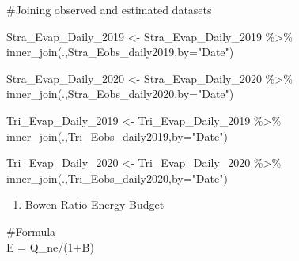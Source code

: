 \documentclass[
]{article}
\newenvironment{Shaded}{\begin{snugshade}}{\end{snugshade}}
\newcommand{\AttributeTok}[1]{\textcolor[rgb]{0.77,0.63,0.00}{#1}}
\newcommand{\DecValTok}[1]{\textcolor[rgb]{0.00,0.00,0.81}{#1}}
\newcommand{\FunctionTok}[1]{\textcolor[rgb]{0.00,0.00,0.00}{#1}}
\newcommand{\NormalTok}[1]{#1}
\newcommand{\OtherTok}[1]{\textcolor[rgb]{0.56,0.35,0.01}{#1}}
\newcommand{\SpecialCharTok}[1]{\textcolor[rgb]{0.00,0.00,0.00}{#1}}
\newcommand{\StringTok}[1]{\textcolor[rgb]{0.31,0.60,0.02}{#1}}
\providecommand{\tightlist}{%
  \setlength{\itemsep}{0pt}\setlength{\parskip}{0pt}}
\begin{document}
\begin{Shaded}
\end{Shaded}

\#Joining observed and estimated datasets

\begin{Shaded}
\begin{Highlighting}[]
\NormalTok{Stra\_Evap\_Daily\_2019 }\OtherTok{\textless{}{-}}\NormalTok{ Stra\_Evap\_Daily\_2019 }\SpecialCharTok{\%\textgreater{}\%} 
  \FunctionTok{inner\_join}\NormalTok{(.,Stra\_Eobs\_daily2019,}\AttributeTok{by=}\StringTok{"Date"}\NormalTok{)}

\NormalTok{Stra\_Evap\_Daily\_2020 }\OtherTok{\textless{}{-}}\NormalTok{ Stra\_Evap\_Daily\_2020 }\SpecialCharTok{\%\textgreater{}\%} 
  \FunctionTok{inner\_join}\NormalTok{(.,Stra\_Eobs\_daily2020,}\AttributeTok{by=}\StringTok{"Date"}\NormalTok{)}

\NormalTok{Tri\_Evap\_Daily\_2019 }\OtherTok{\textless{}{-}}\NormalTok{ Tri\_Evap\_Daily\_2019 }\SpecialCharTok{\%\textgreater{}\%} 
  \FunctionTok{inner\_join}\NormalTok{(.,Tri\_Eobs\_daily2019,}\AttributeTok{by=}\StringTok{"Date"}\NormalTok{)}

\NormalTok{Tri\_Evap\_Daily\_2020 }\OtherTok{\textless{}{-}}\NormalTok{ Tri\_Evap\_Daily\_2020 }\SpecialCharTok{\%\textgreater{}\%} 
  \FunctionTok{inner\_join}\NormalTok{(.,Tri\_Eobs\_daily2020,}\AttributeTok{by=}\StringTok{"Date"}\NormalTok{) }
\end{Highlighting}
\end{Shaded}

\begin{enumerate}
\def\labelenumi{\arabic{enumi}.}
\tightlist
\item
  Bowen-Ratio Energy Budget
\end{enumerate}

\#Formula\\
E = Q\_ne/(1+B)
\end{document}
